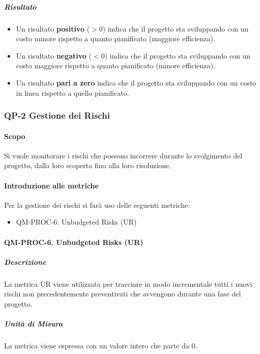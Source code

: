 			\subparagraph{Risultato}
			\begin{itemize}
				\item Un risultato \textbf{positivo} (\(> 0\)) indica che il progetto sta sviluppando con un costo minore rispetto a quanto pianificato (maggiore efficienza).
				\item Un risultato \textbf{negativo} (\(< 0\)) indica che il progetto sta sviluppando con un costo maggiore rispetto a quanto pianificato (minore efficienza).
				\item Un risultato \textbf{pari a zero} indica che il progetto sta sviluppando con un costo in linea rispetto a quello pianificato.
			\end{itemize}
	
	\subsubsection{QP-2 Gestione dei Rischi}

		\paragraph{Scopo}
		
		Si vuole monitorare i rischi che possono incorrere durante lo svolgimento del progetto, dalla loro scoperta fino alla loro risoluzione.

		\paragraph{Introduzione alle metriche}

		Per la gestione dei rischi si farà uso delle seguenti metriche:

		\begin{itemize}
			\item QM-PROC-6. Unbudgeted Risks (UR)
		\end{itemize}

		\paragraph{QM-PROC-6. Unbudgeted Risks (UR)}

			\subparagraph{Descrizione}
			La metrica UR viene utilizzata per tracciare in modo incrementale tutti i nuovi rischi non precedentemente preventivati che avvengono durante una fase del progetto.

			\subparagraph{Unità di Misura}
			La metrica viene espressa con un valore intero che parte da 0.

